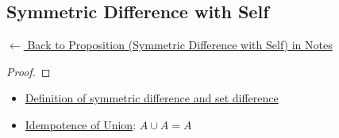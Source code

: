 
\subsection*{Symmetric Difference with Self}
\label{prf:symmdiff-self}

\begin{remark*}[Return]
\hyperref[prop:symmdiff-self]{$\leftarrow$ Back to Proposition (Symmetric Difference with Self) in Notes}
\end{remark*}

\begin{proof}
\end{proof}

\begin{remark*}

\end{remark*}

\begin{remark*}[Dependencies]
\begin{itemize}
  \item \hyperref[def:set-operations]{Definition of symmetric difference and set difference}
  \item \hyperref[prop:idempotence-union]{Idempotence of Union}: $A\cup A = A$
\end{itemize}

\end{remark*}
